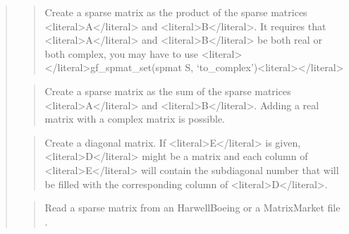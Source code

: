 \documentclass[a4paper,11pt,english]{sphinxmanual}
\begin{document}
\begin{quote}
\sphinxAtStartPar
{}
\begin{quote}

\sphinxAtStartPar
Create a sparse matrix as the product of the sparse matrices \textless{}literal\textgreater{}A\textless{}/literal\textgreater{} and
\textless{}literal\textgreater{}B\textless{}/literal\textgreater{}. It requires that \textless{}literal\textgreater{}A\textless{}/literal\textgreater{} and \textless{}literal\textgreater{}B\textless{}/literal\textgreater{} be both real or both complex, you
may have to use \textless{}literal\textgreater{}\textless{}/literal\textgreater{}gf\_spmat\_set(spmat S, ‘to\_complex’)\textless{}literal\textgreater{}\textless{}/literal\textgreater{}
\end{quote}

\sphinxAtStartPar
{}
\begin{quote}

\sphinxAtStartPar
Create a sparse matrix as the sum of the sparse matrices \textless{}literal\textgreater{}A\textless{}/literal\textgreater{} and \textless{}literal\textgreater{}B\textless{}/literal\textgreater{}.
Adding a real matrix with a complex matrix is possible.
\end{quote}

\sphinxAtStartPar
{}
\begin{quote}

\sphinxAtStartPar
Create a diagonal matrix. If \textless{}literal\textgreater{}E\textless{}/literal\textgreater{} is given, \textless{}literal\textgreater{}D\textless{}/literal\textgreater{} might be a matrix and
each column of \textless{}literal\textgreater{}E\textless{}/literal\textgreater{} will contain the sub\sphinxhyphen{}diagonal number that will be
filled with the corresponding column of \textless{}literal\textgreater{}D\textless{}/literal\textgreater{}.
\end{quote}

\sphinxAtStartPar
{}
\begin{quote}

\sphinxAtStartPar
Read a sparse matrix from an Harwell\sphinxhyphen{}Boeing or a Matrix\sphinxhyphen{}Market file
.
\end{quote}
\end{quote}
\end{document}
